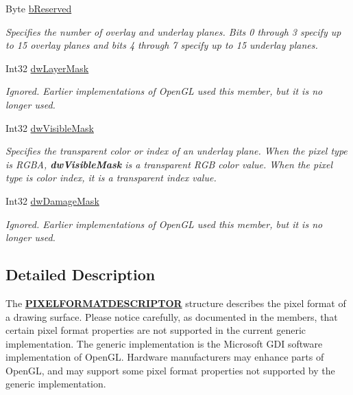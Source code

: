 \begin{DoxyCompactItemize}
Byte \hyperlink{struct_tao_1_1_platform_1_1_windows_1_1_gdi_1_1_p_i_x_e_l_f_o_r_m_a_t_d_e_s_c_r_i_p_t_o_r_a17cebccecdb56ef2f219f9b46e888a57}{bReserved}
\begin{DoxyCompactList}\small\item\em Specifies the number of overlay and underlay planes. Bits 0 through 3 specify up to 15 overlay planes and bits 4 through 7 specify up to 15 underlay planes. \item\end{DoxyCompactList}\item 
Int32 \hyperlink{struct_tao_1_1_platform_1_1_windows_1_1_gdi_1_1_p_i_x_e_l_f_o_r_m_a_t_d_e_s_c_r_i_p_t_o_r_a845b1d2dde8756ca45807233ec266a3f}{dwLayerMask}
\begin{DoxyCompactList}\small\item\em Ignored. Earlier implementations of OpenGL used this member, but it is no longer used. \item\end{DoxyCompactList}\item 
Int32 \hyperlink{struct_tao_1_1_platform_1_1_windows_1_1_gdi_1_1_p_i_x_e_l_f_o_r_m_a_t_d_e_s_c_r_i_p_t_o_r_ac2a5fd400e1fec92b422438c2629cb4b}{dwVisibleMask}
\begin{DoxyCompactList}\small\item\em Specifies the transparent color or index of an underlay plane. When the pixel type is RGBA, {\bfseries dwVisibleMask} is a transparent RGB color value. When the pixel type is color index, it is a transparent index value. \item\end{DoxyCompactList}\item 
Int32 \hyperlink{struct_tao_1_1_platform_1_1_windows_1_1_gdi_1_1_p_i_x_e_l_f_o_r_m_a_t_d_e_s_c_r_i_p_t_o_r_a24eb16cff0e49e7f052163afbc149f89}{dwDamageMask}
\begin{DoxyCompactList}\small\item\em Ignored. Earlier implementations of OpenGL used this member, but it is no longer used. \item\end{DoxyCompactList}\end{DoxyCompactItemize}


\subsection{Detailed Description}
The {\bfseries \hyperlink{struct_tao_1_1_platform_1_1_windows_1_1_gdi_1_1_p_i_x_e_l_f_o_r_m_a_t_d_e_s_c_r_i_p_t_o_r}{PIXELFORMATDESCRIPTOR}} structure describes the pixel format of a drawing surface. Please notice carefully, as documented in the members, that certain pixel format properties are not supported in the current generic implementation. The generic implementation is the Microsoft GDI software implementation of OpenGL. Hardware manufacturers may enhance parts of OpenGL, and may support some pixel format properties not supported by the generic implementation.

